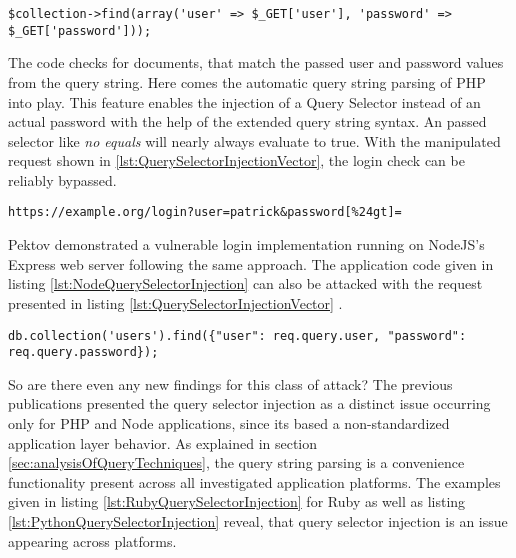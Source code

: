 \begin{lstlisting}[caption={Vulnerable PHP example for query selector injection on MongoDB}, label={lst:PHPQuerySelectorInjection}]
$collection->find(array('user' => $_GET['user'], 'password' => $_GET['password']));
\end{lstlisting}

The code checks for documents, that match the passed user and password values from the query string. Here comes the automatic query string parsing of PHP into play. This feature enables the injection of a Query Selector instead of an actual password with the help of the extended query string syntax. An passed selector like \emph{no equals} will nearly always evaluate to true. With the manipulated request shown in \ref{lst:QuerySelectorInjectionVector}, the login check can be reliably bypassed. \\

\begin{lstlisting}[caption={Attack vector on MongoDB for query selector injection via the query string parameter}, label={lst:QuerySelectorInjectionVector}]
https://example.org/login?user=patrick&password[%24gt]=
\end{lstlisting}

Pektov \cite{Petkov:2014a} demonstrated a vulnerable login implementation running on NodeJS's Express web server following the same approach. The application code given in listing \ref{lst:NodeQuerySelectorInjection} can also be attacked with the request presented in listing \ref{lst:QuerySelectorInjectionVector} . \\

\begin{lstlisting}[caption={Vulnerable NodeJS example for query selector injection on MongoDB}, label={lst:NodeQuerySelectorInjection}]
db.collection('users').find({"user": req.query.user, "password": req.query.password});
\end{lstlisting}

So are there even any new findings for this class of attack? The previous publications presented the query selector injection as a distinct issue occurring only for PHP and Node applications, since its based a non-standardized application layer behavior. As explained in section \ref{sec:analysisOfQueryTechniques}, the query string parsing is a convenience functionality present across all investigated application platforms. The examples given in listing \ref{lst:RubyQuerySelectorInjection} for Ruby as well as listing \ref{lst:PythonQuerySelectorInjection} reveal, that query selector injection is an issue appearing across platforms. \\

